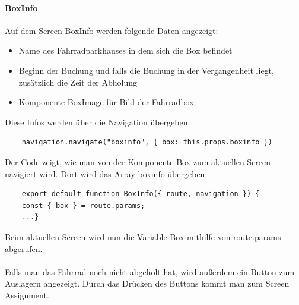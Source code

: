 \paragraph{BoxInfo}
Auf dem Screen BoxInfo werden folgende Daten angezeigt:\\
\begin{itemize}
    \item Name des Fahrradparkhauses in dem sich die Box befindet
    \item Beginn der Buchung und falls die Buchung in der Vergangenheit liegt, zusätzlich die Zeit der Abholung
    \item Komponente BoxImage für Bild der Fahrradbox
\end{itemize}
Diese Infos werden über die Navigation übergeben.\\ 
\begin{verbatim}
    navigation.navigate("boxinfo", { box: this.props.boxinfo })
\end{verbatim}
Der Code zeigt, wie man von der Komponente Box zum aktuellen Screen navigiert wird. Dort wird das Array boxinfo übergeben.\\
\begin{verbatim}
    export default function BoxInfo({ route, navigation }) {
    const { box } = route.params;
    ...}
\end{verbatim}
Beim aktuellen Screen wird nun die Variable Box mithilfe von route.params abgerufen. \\ \\
Falls man das Fahrrad noch nicht abgeholt hat, wird außerdem ein Button zum Auslagern angezeigt. Durch das Drücken des Buttons kommt man zum Screen Assignment.\\
